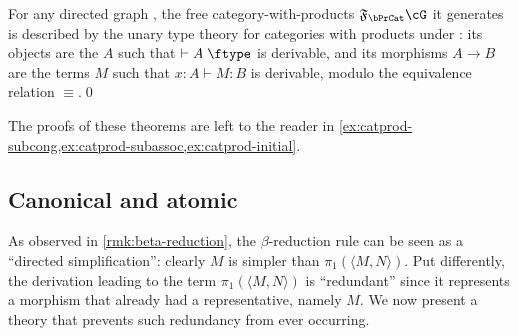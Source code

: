 \documentclass{book}
\let\types\vdash
\def\type{\;\ftype}
\newcommand{\F}[1]{\mathfrak{F}_{#1}}
\def\pair#1#2{\langle #1,#2\rangle}
\begin{document}
\begin{thm}\label{thm:catprod-initial}
  For any directed graph \cG, the free category-with-products $\F\bPrCat \cG$ it generates is described by the unary type theory for categories with products under \cG: its objects are the $A$ such that $\types A\type$ is derivable, and its morphisms $A\to B$ are the terms $M$ such that $x:A \types M:B$ is derivable, modulo the equivalence relation $\equiv$.\qed
\end{thm}

The proofs of these theorems are left to the reader in \cref{ex:catprod-subcong,ex:catprod-subassoc,ex:catprod-initial}.


\subsection{Canonical and atomic}
\label{sec:catprod-atomcan}

As observed in \cref{rmk:beta-reduction}, the $\beta$-reduction rule can be seen as a ``directed simplification'': clearly $M$ is simpler than $\pi_1(\pair M N)$.
Put differently, the derivation leading to the term $\pi_1(\pair M N)$ is ``redundant'' since it represents a morphism that already had a representative, namely $M$.
We now present a theory that prevents such redundancy from ever occurring.
\end{document}
